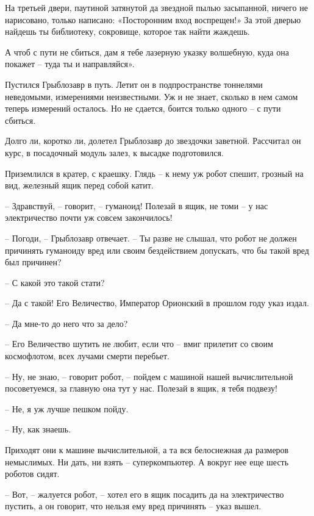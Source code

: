 \documentclass[ebook,oneside,final,openright]{memoir}
\begin{document}
\par
На третьей двери, паутиной затянутой да звездной пылью засыпанной, ничего не нарисовано, только написано: «Посторонним вход воспрещен!» За этой дверью найдешь ты библиотеку, сокровище, которое так найти жаждешь.\par
\par
А чтоб с пути не сбиться, дам я тебе лазерную указку волшебную, куда она покажет – туда ты и направляйся».\par
\par
Пустился Грыблозавр в путь. Летит он в подпространстве тоннелями неведомыми, измерениями неизвестными. Уж и не знает, сколько в нем самом теперь измерений осталось. Но не сдается, боится только одного – с пути сбиться.\par
\par
Долго ли, коротко ли, долетел Грыблозавр до звездочки заветной. Рассчитал он курс, в посадочный модуль залез, к высадке подготовился.\par
\par
Приземлился в кратер, с краешку. Глядь – к нему уж робот спешит, грозный на вид, железный ящик перед собой катит.\par
– Здравствуй, – говорит, – гуманоид! Полезай в ящик, не томи – у нас электричество почти уж совсем закончилось!\par
– Погоди, – Грыблозавр отвечает. – Ты разве не слышал, что робот не должен причинять гуманоиду вред или своим бездействием допускать, что бы такой вред был причинен?\par
– С какой это такой стати?\par
– Да с такой! Его Величество, Император Орионский в прошлом году указ издал.\par
– Да мне-то до него что за дело?\par
– Его Величество шутить не любит, если что – вмиг прилетит со своим космофлотом, всех лучами смерти перебьет.\par
– Ну, не знаю, – говорит робот, – пойдем с машиной нашей вычислительной посоветуемся, за главную она тут у нас. Полезай в ящик, я тебя подвезу!\par
– Не, я уж лучше пешком пойду. \par
– Ну, как знаешь. \par
\par
Приходят они к машине вычислительной, а та вся белоснежная да размеров немыслимых. Ни дать, ни взять – суперкомпьютер. А вокруг нее еще шесть роботов сидят. \par
– Вот, – жалуется робот, – хотел его в ящик посадить да на электричество пустить, а он говорит, что нельзя ему вред причинять – указ вышел. \par
\end{document}
